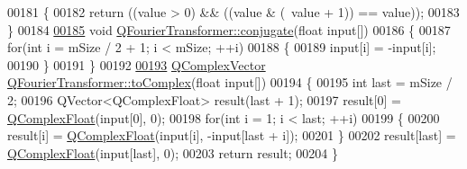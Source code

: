\begin{DoxyCode}
00181 \{
00182     \textcolor{keywordflow}{return} ((value > 0) && ((value & (~value + 1)) == value));
00183 \}
00184 
\hypertarget{a00121_source_l00185}{}\hyperlink{a00054_a23874623179dfd2b9684856f0b2f9f25}{00185} \textcolor{keywordtype}{void} \hyperlink{a00054_a23874623179dfd2b9684856f0b2f9f25}{QFourierTransformer::conjugate}(\textcolor{keywordtype}{float} input[])
00186 \{
00187     \textcolor{keywordflow}{for}(\textcolor{keywordtype}{int} i = mSize / 2 + 1; i < mSize; ++i)
00188     \{
00189         input[i] = -input[i];
00190     \}
00191 \}
00192 
\hypertarget{a00121_source_l00193}{}\hyperlink{a00054_af3c641ac46b1fdd78a0b390daae9859c}{00193} \hyperlink{a00122_a3f6b3838bd0d647c7fe12093694e5c5e}{QComplexVector} \hyperlink{a00054_af3c641ac46b1fdd78a0b390daae9859c}{QFourierTransformer::toComplex}(\textcolor{keywordtype}{float} input[])
00194 \{
00195     \textcolor{keywordtype}{int} last = mSize / 2;
00196     QVector<QComplexFloat> result(last + 1);
00197     result[0] = \hyperlink{a00114_ad957a9578f5201ba6cd85e0369965a0e}{QComplexFloat}(input[0], 0);
00198     \textcolor{keywordflow}{for}(\textcolor{keywordtype}{int} i = 1; i < last; ++i)
00199     \{
00200         result[i] = \hyperlink{a00114_ad957a9578f5201ba6cd85e0369965a0e}{QComplexFloat}(input[i], -input[last + i]);
00201     \}
00202     result[last] = \hyperlink{a00114_ad957a9578f5201ba6cd85e0369965a0e}{QComplexFloat}(input[last], 0);
00203     \textcolor{keywordflow}{return} result;
00204 \}
\end{DoxyCode}
